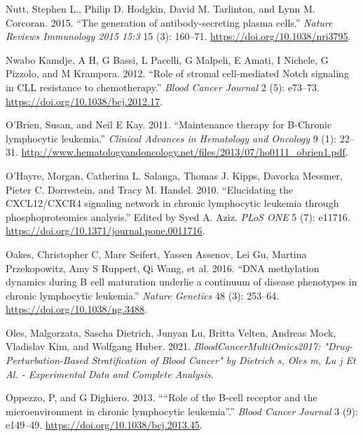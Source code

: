 \documentclass[11pt, a4paper, twosided]{book}
\newenvironment{CSLReferences}%
  {}%
  {\par}
\begin{document}
\begin{CSLReferences}{1}{0}
\leavevmode{}%
Nutt, Stephen L., Philip D. Hodgkin, David M. Tarlinton, and Lynn M. Corcoran. 2015. {``{The generation of antibody-secreting plasma cells}.''} \emph{Nature Reviews Immunology 2015 15:3} 15 (3): 160--71. \url{https://doi.org/10.1038/nri3795}.

\leavevmode{}%
Nwabo Kamdje, A H, G Bassi, L Pacelli, G Malpeli, E Amati, I Nichele, G Pizzolo, and M Krampera. 2012. {``{Role of stromal cell-mediated Notch signaling in CLL resistance to chemotherapy}.''} \emph{Blood Cancer Journal} 2 (5): e73--73. \url{https://doi.org/10.1038/bcj.2012.17}.

\leavevmode{}%
O'Brien, Susan, and Neil E Kay. 2011. {``{Maintenance therapy for B-Chronic lymphocytic leukemia}.''} \emph{Clinical Advances in Hematology and Oncology} 9 (1): 22--31. \url{http://www.hematologyandoncology.net/files/2013/07/ho0111_obrien1.pdf}.

\leavevmode{}%
O'Hayre, Morgan, Catherina L. Salanga, Thomas J. Kipps, Davorka Messmer, Pieter C. Dorrestein, and Tracy M. Handel. 2010. {``{Elucidating the CXCL12/CXCR4 signaling network in chronic lymphocytic leukemia through phosphoproteomics analysis}.''} Edited by Syed A. Aziz. \emph{PLoS ONE} 5 (7): e11716. \url{https://doi.org/10.1371/journal.pone.0011716}.

\leavevmode{}%
Oakes, Christopher C, Marc Seifert, Yassen Assenov, Lei Gu, Martina Przekopowitz, Amy S Ruppert, Qi Wang, et al. 2016. {``{DNA methylation dynamics during B cell maturation underlie a continuum of disease phenotypes in chronic lymphocytic leukemia}.''} \emph{Nature Genetics} 48 (3): 253--64. \url{https://doi.org/10.1038/ng.3488}.

\leavevmode{}%
Oles, Malgorzata, Sascha Dietrich, Junyan Lu, Britta Velten, Andreas Mock, Vladislav Kim, and Wolfgang Huber. 2021. \emph{BloodCancerMultiOmics2017: "Drug-Perturbation-Based Stratification of Blood Cancer" by Dietrich s, Oles m, Lu j Et Al. - Experimental Data and Complete Analysis}.

\leavevmode{}%
Oppezzo, P, and G Dighiero. 2013. {``{``Role of the B-cell receptor and the microenvironment in chronic lymphocytic leukemia''}.''} \emph{Blood Cancer Journal} 3 (9): e149--49. \url{https://doi.org/10.1038/bcj.2013.45}.


\end{CSLReferences}
\end{document}
